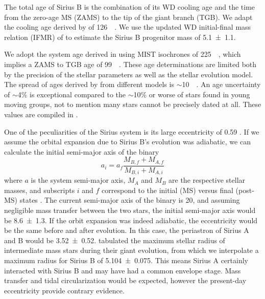 \documentclass[twocolumn]{aastex631}
\begin{document}
The total age of Sirius B is the combination of its WD cooling age and the time from the zero-age MS (ZAMS) to the tip of the giant branch (TGB). We adapt the cooling age derived by \citet[sec. 8]{bondSiriusSystemIts2017} of \qty{126}{\mega\year}. We use the updated WD initial-final mass relation (IFMR) of \citet{cummingsWhiteDwarfInitialFinal2018} to estimate the Sirius B progenitor mass of \qty{5.1\pm1.1}{\solarmass}.

We adopt the system age derived in \citet{cummingsWhiteDwarfInitialFinal2018} using MIST isochrones of \qty{225}{\mega\year}, which implies a ZAMS to TGB age of \qty{99}{\mega\year}. These age determinations are limited both by the precision of the stellar parameters as well as the stellar evolution model. The spread of ages derived by \citet{cummingsWhiteDwarfInitialFinal2018} from different models is $\sim$\qty{10}{\mega\year}. An age uncertainty of $\sim$4\% is exceptional compared to the $\sim$10\% or worse of stars found in young moving groups, not to mention many stars cannot be precisely dated at all. These values are compiled in .


One of the peculiarities of the Sirius system is its large eccentricity of 0.59 \citep{bondSiriusSystemIts2017}. If we assume the orbital expansion due to Sirius B's evolution was adiabatic, we can calculate the initial semi-major axis of the binary
\begin{equation}
    a_i = a_f \frac{M_{B,f} + M_{A,f}}{M_{B,i} + M_{A,i}}
\end{equation}
where $a$ is the system semi-major axis, $M_A$ and $M_B$ are the respective stellar masses, and subscripts $i$ and $f$ correspond to the initial (MS) versus final (post-MS) states \citep{jeansCosmogonicProblemsAssociated1924}. The current semi-major axis of the binary is \qty{20}{\au}, and assuming negligible mass transfer between the two stars, the initial semi-major axis would be \qty{8.6\pm1.3}{\au}. If the orbit expansion was indeed adiabatic, the eccentricity would be the same before and after evolution. In this case, the periastron of Sirius A and B would be \qty{3.52\pm0.52}{\au}. \citet{verasPostmainsequencePlanetarySystem2016} tabulated the maximum stellar radius of intermediate mass stars during their giant evolution, from which we interpolate a maximum radius for Sirius B of \qty{5.104\pm0.075}{\au}. This means Sirius A certainly interacted with Sirius B and may have had a common envelope stage. Mass transfer and tidal circularization would be expected, however the present-day eccentricity provide contrary evidence.
\end{document}
